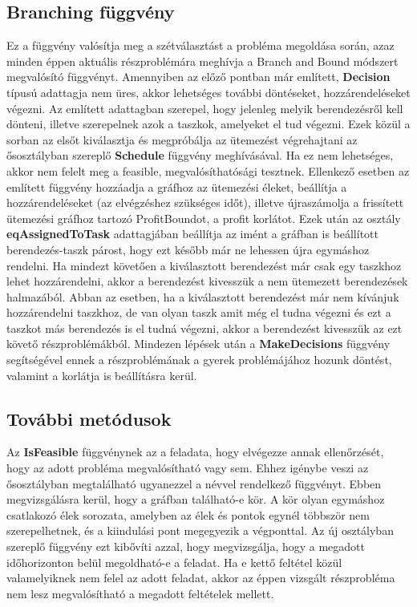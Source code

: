 \subsection{Branching függvény}
Ez a függvény valósítja meg a szétválasztást a probléma megoldása során, azaz minden éppen aktuális részproblémára meghívja a Branch and Bound módszert megvalósító függvényt.
Amennyiben az előző pontban már említett, \textbf{Decision} típusú adattagja nem üres, akkor lehetséges további döntéseket, hozzárendeléseket végezni.
Az említett adattagban szerepel, hogy jelenleg melyik berendezésről kell dönteni, illetve szerepelnek azok a taszkok, amelyeket el tud végezni.
Ezek közül a sorban az elsőt kiválasztja és megpróbálja az ütemezést végrehajtani az ősosztályban szereplő \textbf{Schedule} függvény meghívásával.
Ha ez nem lehetséges, akkor nem felelt meg a feasible, megvalósíthatósági tesztnek.
Ellenkező esetben az említett függvény hozzáadja a gráfhoz az ütemezési éleket, beállítja a hozzárendeléseket (az elvégzéshez szükséges időt), illetve újraszámolja a frissített ütemezési gráfhoz tartozó ProfitBoundot, a profit korlátot.
Ezek után az osztály \textbf{eqAssignedToTask} adattagjában beállítja az imént a gráfban is beállított berendezés-taszk párost, hogy ezt később már ne lehessen újra egymáshoz rendelni.
Ha mindezt követően a kiválasztott berendezést már csak egy taszkhoz lehet hozzárendelni, akkor a berendezést kivesszük a nem ütemezett berendezések halmazából.
Abban az esetben, ha a kiválasztott berendezést már nem kívánjuk hozzárendelni taszkhoz, de van olyan taszk amit még el tudna végezni és ezt a taszkot más berendezés is el tudná végezni, akkor a berendezést kivesszük az ezt követő részproblémákból.
Mindezen lépések után a \textbf{MakeDecisions} függvény segítségével ennek a részproblémának a gyerek problémájához hozunk döntést, valamint a korlátja is beállításra kerül.

\subsection{További metódusok}
Az \textbf{IsFeasible} függvénynek az a feladata, hogy elvégezze annak ellenőrzését, hogy az adott probléma megvalósítható vagy sem.
Ehhez igénybe veszi az ősosztályban megtalálható ugyanezzel a névvel rendelkező függvényt.
Ebben  megvizsgálásra kerül, hogy a gráfban található-e kör.
A kör olyan egymáshoz csatlakozó élek sorozata, amelyben az élek és pontok egynél többször nem szerepelhetnek, és a kiindulási pont megegyezik a végponttal.
Az új osztályban szereplő függvény ezt kibővíti azzal, hogy megvizsgálja, hogy a megadott időhorizonton belül megoldható-e a feladat.
Ha e kettő feltétel közül valamelyiknek nem felel az adott feladat, akkor az éppen vizsgált részprobléma nem lesz megvalósítható a megadott feltételek mellett.

